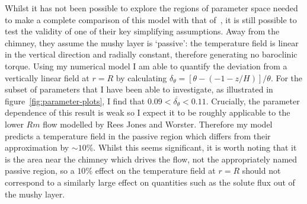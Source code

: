 \documentclass[11pt,twocolumn]{article}
\begin{document}
Whilst it has not been possible to explore the regions of parameter space needed to make a complete comparison of this model with that of~\citet*{rees-jones-worster-13}, it is still possible to test the validity of one of their key simplifying assumptions. Away from the chimney, they assume the mushy layer is `passive': the temperature field is linear in the vertical direction and radially constant, therefore generating no baroclinic torque. Using my numerical model I am able to quantify the deviation from a vertically linear field at $r=R$ by calculating $ \delta_\theta = \left[\theta - (-1-z/H)\right] / \theta$. For the subset of parameters that I have been able to investigate, as illustrated in figure~\ref{fig:parameter-plots}, I find that $ 0.09 < \overline{ \delta_\theta} < 0.11 $. Crucially, the parameter dependence of this result is weak so I expect it to be roughly applicable to the lower $Rm$ flow modelled by Rees Jones and Worster. Therefore my model predicts a temperature field in the passive region which differs from their approximation by $\sim10\%$. Whilst this seems significant, it is worth noting that it is the area near the chimney which drives the flow, not the appropriately named passive region, so a $10\%$ effect on the temperature field at $r=R$ should not correspond to a similarly large effect on quantities such as the solute flux out of the mushy layer.

\end{document}
